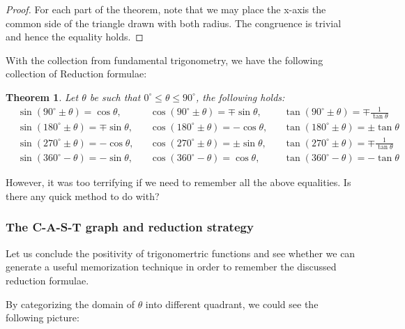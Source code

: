 \documentclass[12pt]{article}
\newtheorem*{theorem}{Theorem}
\begin{document}
    \begin{proof}
        For each part of the theorem, note that we may place the x-axis the common side of the triangle drawn with both radius. The congruence is trivial and hence the equality holds.
    \end{proof}

    With the collection from fundamental trigonometry, we have the following collection of Reduction formulae:

    \begin{theorem}
        Let $\theta$ be such that $0^\circ\leq \theta\leq 90^\circ$, the following holds: \begin{align*}
            &\sin(90^\circ\pm\theta)=\cos{\theta},&&\cos(90^\circ\pm\theta)=\mp\sin{\theta},&&\tan(90^\circ\pm\theta)=\mp\frac{1}{\tan{\theta}}\\
            &\sin(180^\circ\pm\theta)=\mp\sin{\theta},&&\cos(180^\circ\pm\theta)=-\cos{\theta},&&\tan(180^\circ\pm\theta)=\pm\tan{\theta}\\
            &\sin(270^\circ\pm\theta)=-\cos{\theta},&&\cos(270^\circ\pm\theta)=\pm\sin{\theta},&&\tan(270^\circ\pm\theta)=\mp\frac{1}{\tan{\theta}}\\
            &\sin(360^\circ - \theta)=-\sin{\theta},&&\cos(360^\circ - \theta)=\cos{\theta},&&\tan(360^\circ - \theta)=-\tan{\theta}
        \end{align*}
    \end{theorem}

    However, it was too terrifying if we need to remember all the above equalities. Is there any quick method to do with?

    \subsubsection*{The C-A-S-T graph and reduction strategy}

    Let us conclude the positivity of trigonomertric functions and see whether we can generate a useful memorization technique in order to remember the discussed reduction formulae.

    By categorizing the domain of $\theta$ into different quadrant, we could see the following picture:
\end{document}
